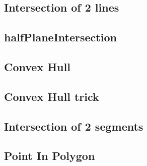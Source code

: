 \documentclass[a4paper,10pt,twocolumn,oneside]{article}
\begin{document}
\subsection{Intersection of 2 lines}


% 
\subsection{halfPlaneIntersection}


\subsection{Convex Hull}


\subsection{Convex Hull trick}


%

\subsection{Intersection of 2 segments}


%

%

\subsection{Point In Polygon}

\end{document}
